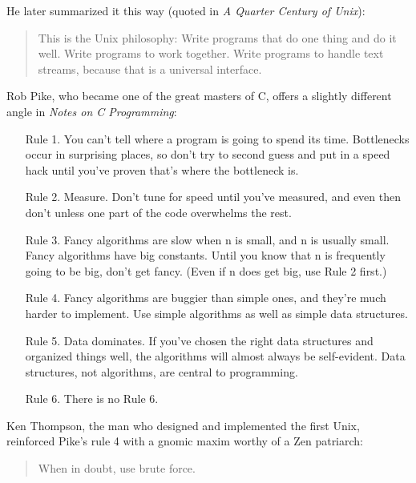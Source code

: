 \documentclass[10pt,twoside,openright]{memoir}
\begin{document}
He later summarized it this way (quoted in \emph{A Quarter Century of Unix}):

\begin{quote}
This is the Unix philosophy: Write programs that do one thing and do it well. Write programs to work together. Write programs to handle text streams, because that is a universal interface.
\end{quote}

Rob Pike, who became one of the great masters of C, offers a slightly different angle in \emph{Notes on C Programming}:

\begin{itemize}
  
\item[Rule 1.] You can't tell where a program is going to spend its time. Bottlenecks occur in surprising places, so don't try to second guess and put in a speed hack until you've proven that's where the bottleneck is.

\item[Rule 2.] Measure. Don't tune for speed until you've measured, and even then don't unless one part of the code overwhelms the rest.

\item[Rule 3.] Fancy algorithms are slow when n is small, and n is usually small. Fancy algorithms have big constants. Until you know that n is frequently going to be big, don't get fancy. (Even if n does get big, use Rule 2 first.)

\item[Rule 4.] Fancy algorithms are buggier than simple ones, and they're much harder to implement. Use simple algorithms as well as simple data structures.

\item[Rule 5.] Data dominates. If you've chosen the right data structures and organized things well, the algorithms will almost always be self-evident. Data structures, not algorithms, are central to programming.

\item[Rule 6.] There is no Rule 6.

\end{itemize}

Ken Thompson, the man who designed and implemented the first Unix, reinforced Pike's rule 4 with a gnomic maxim worthy of a Zen patriarch:

\begin{quote}
When in doubt, use brute force.
\end{quote}
\end{document}
